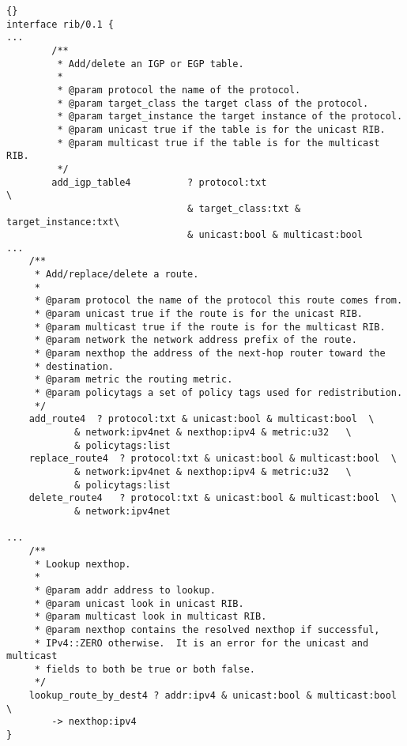 \documentclass[11pt]{article}
\newcommand{\stt}{\tt\small}
\begin{document}
\newpage
\begin{lstlisting}[caption={Extracts from {\stt xorp/xrl/interfaces/rib.xif} %
                                     \label{lst:rib.xif} } ]{}
interface rib/0.1 {
...
        /**
         * Add/delete an IGP or EGP table.
         *
         * @param protocol the name of the protocol.
         * @param target_class the target class of the protocol.
         * @param target_instance the target instance of the protocol.
         * @param unicast true if the table is for the unicast RIB.
         * @param multicast true if the table is for the multicast RIB.
         */
        add_igp_table4          ? protocol:txt                          \
                                & target_class:txt & target_instance:txt\
                                & unicast:bool & multicast:bool
...
	/**
	 * Add/replace/delete a route.
	 *
	 * @param protocol the name of the protocol this route comes from.
	 * @param unicast true if the route is for the unicast RIB.
	 * @param multicast true if the route is for the multicast RIB.
	 * @param network the network address prefix of the route.
	 * @param nexthop the address of the next-hop router toward the
	 * destination.
	 * @param metric the routing metric.
	 * @param policytags a set of policy tags used for redistribution.
	 */
	add_route4	? protocol:txt & unicast:bool & multicast:bool	\
			& network:ipv4net & nexthop:ipv4 & metric:u32   \
			& policytags:list
	replace_route4	? protocol:txt & unicast:bool & multicast:bool	\
			& network:ipv4net & nexthop:ipv4 & metric:u32   \
			& policytags:list
	delete_route4	? protocol:txt & unicast:bool & multicast:bool	\
			& network:ipv4net

...
	/**
	 * Lookup nexthop.
	 *
	 * @param addr address to lookup.
	 * @param unicast look in unicast RIB.
	 * @param multicast look in multicast RIB.
	 * @param nexthop contains the resolved nexthop if successful,
	 * IPv4::ZERO otherwise.  It is an error for the unicast and multicast
	 * fields to both be true or both false.
	 */
	lookup_route_by_dest4 ? addr:ipv4 & unicast:bool & multicast:bool \
		-> nexthop:ipv4
}
\end{lstlisting}
\newpage
\end{document}
